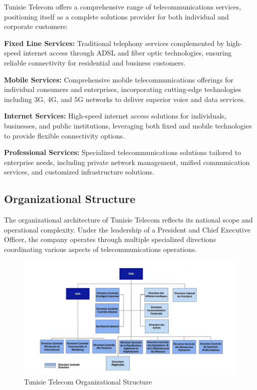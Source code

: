 Tunisie Telecom offers a comprehensive range of telecommunications services, positioning itself as a complete solutions provider for both individual and corporate customers:

\textbf{Fixed Line Services:} Traditional telephony services complemented by high-speed internet access through ADSL and fiber optic technologies, ensuring reliable connectivity for residential and business customers.

\textbf{Mobile Services:} Comprehensive mobile telecommunications offerings for individual consumers and enterprises, incorporating cutting-edge technologies including 3G, 4G, and 5G networks to deliver superior voice and data services.

\textbf{Internet Services:} High-speed internet access solutions for individuals, businesses, and public institutions, leveraging both fixed and mobile technologies to provide flexible connectivity options.

\textbf{Professional Services:} Specialized telecommunications solutions tailored to enterprise needs, including private network management, unified communication services, and customized infrastructure solutions.

\subsection{Organizational Structure}

The organizational architecture of Tunisie Telecom reflects its national scope and operational complexity. Under the leadership of a President and Chief Executive Officer, the company operates through multiple specialized directions coordinating various aspects of telecommunications operations.

\begin{figure}[H]
    \centering
    \includegraphics[width=0.9\columnwidth]{img/company/telecom_organigramme.png}
    \caption{Tunisie Telecom Organizational Structure}
    \label{fig:tt_organigramme}
\end{figure}

